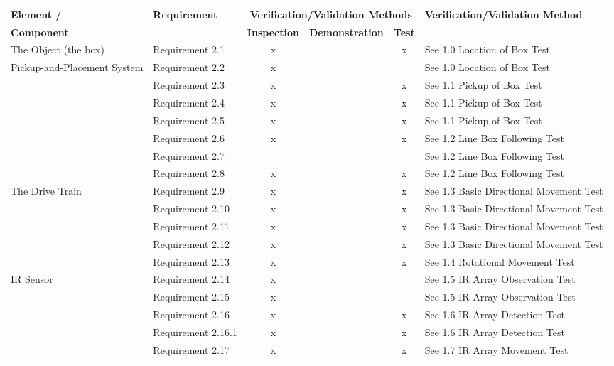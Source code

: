 \documentclass{article}
\begin{document}
{\footnotesize
\begin{tabular}{|>{\centering\arraybackslash}p{4cm}|>{\centering\arraybackslash}m{2cm}|c|c|c|>{\raggedright\arraybackslash}p{4cm}|}
    \hline
    \textbf{Element /} & \textbf{Requirement} & \multicolumn{3}{c|}{\textbf{Verification/Validation Methods}} & \textbf{Verification/Validation Method} \\
    \textbf{Component} & & \textbf{Inspection} & \textbf{Demonstration} & \textbf{Test} & \\
    \hline
    The Object (the box) & Requirement 2.1 & x & & x & See 1.0 Location of Box Test \\
    Pickup-and-Placement System & Requirement 2.2 & x & & & See 1.0 Location of Box Test \\
    \cline{2-6}
    & Requirement 2.3 & x & & x & See 1.1 Pickup of Box Test \\
    \cline{2-6}
    & Requirement 2.4 & x & & x & See 1.1 Pickup of Box Test \\
    \cline{2-6}
    & Requirement 2.5 & x & & x & See 1.1 Pickup of Box Test \\
    \cline{2-6}
    & Requirement 2.6 & x & & x & See 1.2 Line Box Following Test \\
    \cline{2-6}
    & Requirement 2.7 & & & & See 1.2 Line Box Following Test \\
    \cline{2-6}
    & Requirement 2.8 & x & & x & See 1.2 Line Box Following Test \\
    \hline
    The Drive Train & Requirement 2.9 & x & & x & See 1.3 Basic Directional Movement Test \\
    \cline{2-6}
    & Requirement 2.10 & x & & x & See 1.3 Basic Directional Movement Test \\
    \cline{2-6}
    & Requirement 2.11 & x & & x & See 1.3 Basic Directional Movement Test \\
    \cline{2-6}
    & Requirement 2.12 & x & & x & See 1.3 Basic Directional Movement Test \\
    \cline{2-6}
    & Requirement 2.13 & x & & x & See 1.4 Rotational Movement Test \\
    \hline
    IR Sensor & Requirement 2.14 & x & & & See 1.5 IR Array Observation Test \\
    \cline{2-6}
    & Requirement 2.15 & x & & & See 1.5 IR Array Observation Test \\
    \cline{2-6}
    & Requirement 2.16 & x & & x & See 1.6 IR Array Detection Test \\
    \cline{2-6}
    & Requirement 2.16.1 & x & & x & See 1.6 IR Array Detection Test \\
    \cline{2-6}
    & Requirement 2.17 & x & & x & See 1.7 IR Array Movement Test \\
    \hline
\end{tabular}
}
\end{document}

